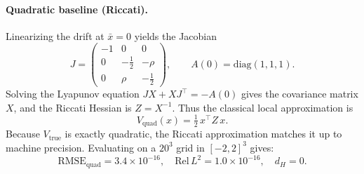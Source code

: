 \documentclass[11pt]{article}
\theoremstyle{plain}      %
\theoremstyle{definition} %
\begin{document}
\paragraph{Quadratic baseline (Riccati).}
Linearizing the drift at $\bar{x}=0$ yields the Jacobian
\[
J
=
\begin{pmatrix}
-1 & 0 & 0 \\
0 & -\tfrac12 & -\rho\\
0 & \rho & -\tfrac12
\end{pmatrix},
\qquad
A(0)=\mathrm{diag}(1,1,1).
\]
Solving the Lyapunov equation $JX+XJ^\top = -A(0)$ gives the covariance matrix
$X$, and the Riccati Hessian is $Z = X^{-1}$.  
Thus the classical local approximation is
\[
V_{\mathrm{quad}}(x)=\tfrac12\,x^\top Z\,x.
\]
Because $V_{\mathrm{true}}$ is exactly quadratic, the Riccati approximation
matches it up to machine precision.  
Evaluating on a $20^3$ grid in $[-2,2]^3$ gives:
\[
\mathrm{RMSE}_{\mathrm{quad}}
= 3.4\times 10^{-16},\quad
\mathrm{Rel}\,L^2 = 1.0\times 10^{-16},\quad
d_H = 0.
\]

\end{document}

